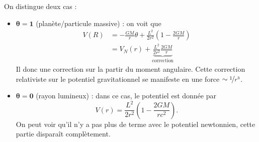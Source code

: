 \documentclass[a4paper,11pt]{report}
\theoremstyle{definition}
\theoremstyle{plain}
\theoremstyle{definition}
\theoremstyle{remark}
\begin{document}
            On distingue deux cas :
            \begin{itemize}[label = \textbullet]
                \item $\boldsymbol{\theta = 1}$ (planète/particule massive) : on voit que 
                \begin{align}
                    V(R) &= -\frac{GM}{r}\theta+\frac{L^2}{2r^2}\left( 1-\frac{2GM}{r} \right)\\
                    &= V_N(r)+\underbrace{\frac{L^2}{2r^2}\frac{2GM}{r}}_{\text{correction}}
                \end{align}
                Il donc une correction sur la partir du moment angulaire. Cette correction relativiste sur le potentiel gravitationnel se manifeste en une force $\sim\nicefrac{1}{r^3}$. 
                \item $\boldsymbol{\theta = 0}$ (rayon lumineux) : dans ce cas, le potentiel est donnée par
                \begin{equation}
                    V(r) = \frac{L^2}{2r^2}\left( 1-\frac{2GM}{rc^2} \right).
                \end{equation}
                On peut voir qu'il n'y a pas plus de terme avec le potentiel newtonnien, cette partie disparaît complètement.
            \end{itemize}
            
            
\end{document}
